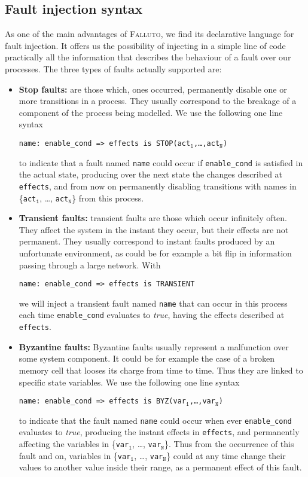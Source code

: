 \documentclass{llncs2e/llncs}
\newcommand{\falluto}{\nohyphens{\textsc{Falluto}}}
\newcommand{\undtt}[1]{$_{\texttt{#1}}$}                %
\newcommand{\undfll}[1]{\undtt{#1}}                     %
\newcommand{\textfll}[1]{\texttt{#1}}                   %
\begin{document}
\subsection{Fault injection syntax}
As one of the main advantages of \falluto, we find its declarative language for fault injection. It offers us the possibility of injecting in a simple line of code practically all the information that describes the behaviour of a fault over our processes. The three types of faults actually supported are:
\begin{itemize}

\item \textbf{Stop faults:} are those which, ones occurred, permanently disable one or more transitions in a process. They usually correspond to the breakage of a component of the process being modelled. We use the following one line syntax
\begin{center}
\textfll{name: enable\_cond => effects is STOP(act\undfll{1},\ldots,act\undfll{N})}
\end{center}
to indicate that a fault named \textfll{name} could occur if \textfll{enable\_cond} is satisfied in the actual state, producing over the next state the changes described at \textfll{effects}, and from now on permanently disabling transitions with names in \{\textfll{act\undfll{1}}, \ldots, \textfll{act\undfll{N}}\} from this process.

\item \textbf{Transient faults:} transient faults are those which occur infinitely often. They affect the system in the instant they occur, but their effects are not permanent. They usually correspond to instant faults produced by an unfortunate environment, as could be for example a bit flip in information passing through a large network. With
\begin{center}
\textfll{name: enable\_cond => effects is TRANSIENT}
\end{center}
we will inject a transient fault named \textfll{name} that can occur in this process each time \textfll{enable\_cond} evaluates to \textit{true}, having the effects described at \textfll{effects}.

\item \textbf{Byzantine faults:} Byzantine faults usually represent a malfunction over some system component. It could be for example the case of a broken memory cell that looses its charge from time to time. Thus they are linked to specific state variables. We use the following one line syntax
\begin{center}
\textfll{name: enable\_cond => effects is BYZ(var\undfll{1},\ldots,var\undfll{N})}
\end{center}
to indicate that the fault named \textfll{name} could occur when ever \textfll{enable\_cond} evaluates to \textit{true}, producing the instant effects in \textfll{effects}, and permanently affecting the variables in \{\textfll{var\undfll{1}}, \ldots, \textfll{var\undfll{N}}\}. Thus from the occurrence of this fault and on, variables in \{\textfll{var\undfll{1}}, \ldots, \textfll{var\undfll{N}}\} could at any time change their values to another value inside their range, as a permanent effect of this fault.
\end{itemize}
\end{document}
